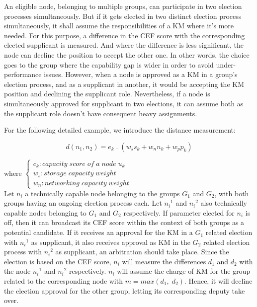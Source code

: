 An eligible node, belonging to multiple groups, can participate in two election processes simultaneously. But if it gets elected in two distinct election process simultaneously, it shall assume the responsibilities of a KM where it’s more needed. For this purpose, a difference in the CEF score with the corresponding elected supplicant is measured. And where the difference is less significant, the node can decline the position to accept the other one. In other words, the choice goes to the group where the capability gap is wider in order to avoid under-performance issues. However, when a node is approved as a KM in a group’s election process, and as a supplicant in another, it would be accepting the KM position and declining the supplicant role. Nevertheless, if a node is simultaneously approved for supplicant in two elections, it can assume both as the supplicant role doesn’t have consequent heavy assignments.

For the following detailed example, we introduce the distance measurement:

\begin{equation}\label{eq5}
	d\left(n_1, n_2\right)  = e_k \; .\; \left( w_s s_k + w_n n_k +  w_p p_k \right)
\end{equation}

where
\begin{math}
	\left\{
	\begin{array}{l}
		c_k: capacity\; score\; of\; a\; node\; u_k\\
		w_s: storage\; capacity\; weight\\
		w_n: networking\; capacity\; weight
	\end{array}
	\right.
\end{math}\\

Let $n_i$ a technically capable node belonging to the groups $G_1$ and $G_2$, with both groups having an ongoing election process each. Let ${n_i}^1$ and ${n_i}^2$ also technically capable nodes belonging to $G_1$ and $G_2$ respectively. If parameter elected for $n_i$ is off, then it can broadcast its CEF score within the context of both groups as a potential candidate. If it receives an approval for the KM in a $G_1$ related election with ${n_i}^1$ as supplicant, it also receives approval as KM in the $G_2$ related election process with ${n_i}^2$ as supplicant, an arbitration should take place. Since the election is based on the CEF score, $n_i$ will measure the differences $d_1$ and $d_2$ with the node ${n_i}^1$ and ${n_i}^2$ respectively. $n_i$ will assume the charge of KM for the group related to the corresponding node with $m = max\left(d_1,\; d_2\right)$. Hence, it will decline the election approval for the other group, letting its corresponding deputy take over.

